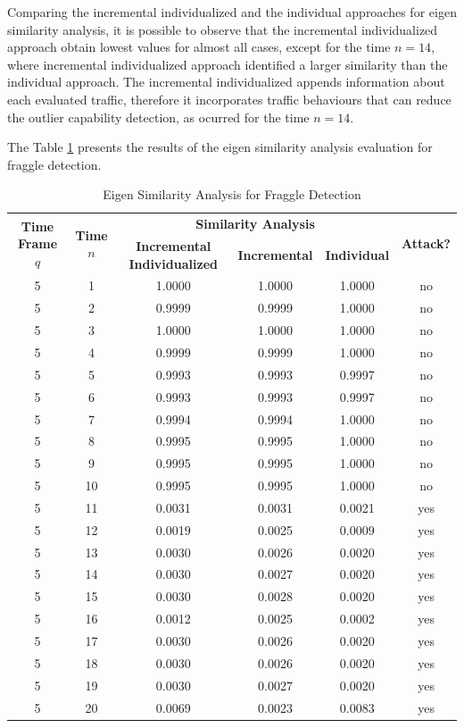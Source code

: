\documentclass{bmcart}
\begin{document}
Comparing the incremental individualized and the individual approaches for eigen similarity analysis, it is possible to observe that the incremental individualized approach obtain lowest values for almost all cases, except for the time $n=14$, where incremental individualized approach identified a larger similarity than the individual approach. The incremental individualized appends information about each evaluated traffic, therefore it incorporates traffic behaviours that can reduce the outlier capability detection, as ocurred for the time $n=14$.

The Table \ref{tab:tab7} presents the results of the eigen similarity analysis evaluation for fraggle detection.

\begin{table}[h!]
  \centering
  \footnotesize
  \caption{Eigen Similarity Analysis for Fraggle Detection}
  \label{tab:tab7}
  \begin{tabular}{ c c c c c c }
	\toprule
	\multirow{2}{*}{\textbf{Time Frame} $q$} &\multirow{2}{*}{\textbf{Time} $n$}   &\multicolumn{3}{c}{\textbf{Similarity Analysis}} &\multirow{2}{*}{\textbf{Attack?}}\\ 
			\hhline{~~---~}
			& &\textbf{Incremental Individualized} &\textbf{Incremental} &\textbf{Individual}\\
	\midrule
	5 &1 &1.0000 &1.0000 &1.0000 &no \\
	5 &2 &0.9999 &0.9999 &1.0000 &no \\
	5 &3 &1.0000 &1.0000 &1.0000 &no \\
	5 &4 &0.9999 &0.9999 &1.0000 &no \\
	5 &5 &0.9993 &0.9993 &0.9997 &no \\
	5 &6 &0.9993 &0.9993 &0.9997 &no \\
	5 &7 &0.9994 &0.9994 &1.0000 &no \\
	5 &8 &0.9995 &0.9995 &1.0000 &no \\
	5 &9 &0.9995 &0.9995 &1.0000 &no \\
	5 &10 &0.9995 &0.9995 &1.0000 &no \\
	5 &11 &0.0031 &0.0031 &0.0021 &yes \\
	5 &12 &0.0019 &0.0025 &0.0009 &yes \\
	5 &13 &0.0030 &0.0026 &0.0020 &yes \\
	5 &14 &0.0030 &0.0027 &0.0020 &yes \\
	5 &15 &0.0030 &0.0028 &0.0020 &yes \\
	5 &16 &0.0012 &0.0025 &0.0002 &yes \\
	5 &17 &0.0030 &0.0026 &0.0020 &yes \\
	5 &18 &0.0030 &0.0026 &0.0020 &yes \\
	5 &19 &0.0030 &0.0027 &0.0020 &yes \\
	5 &20 &0.0069 &0.0023 &0.0083 &yes \\
    \bottomrule
  \end{tabular}
\end{table}
\end{document}
